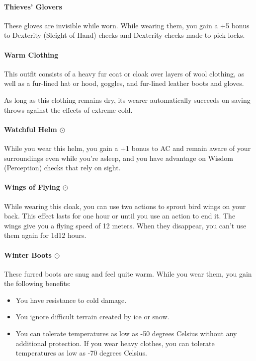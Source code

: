     \paragraph{Thieves' Glovers}
        These gloves are invisible while worn.
        While wearing them, you gain a +5 bonus to Dexterity (Sleight of Hand) checks and Dexterity checks made to pick locks.
    \paragraph{Warm Clothing}
        This outfit consists of a heavy fur coat or cloak over layers of wool clothing, as well as a fur-lined hat or hood, goggles, and fur-lined leather boots and gloves.

        As long as this clothing remains dry, its wearer automatically succeeds on saving throws against the effects of extreme cold.
    \paragraph{Watchful Helm $\odot$}
        While you wear this helm, you gain a +1 bonus to AC and remain aware of your surroundings even while you're asleep, and you have advantage on Wisdom (Perception) checks that rely on sight.
    \paragraph{Wings of Flying $\odot$}
        While wearing this cloak, you can use two actions to sprout bird wings on your back.
        This effect lasts for one hour or until you use an action to end it.
        The wings give you a flying speed of 12 meters.
        When they disappear, you can't use them again for 1d12 hours.
    \paragraph{Winter Boots $\odot$}
        These furred boots are snug and feel quite warm.
        While you wear them, you gain the following benefits:
        \begin{itemize}
            \item You have resistance to cold damage.
            \item You ignore difficult terrain created by ice or snow.
            \item You can tolerate temperatures as low as -50 degrees Celsius without any additional protection.
            If you wear heavy clothes, you can tolerate temperatures as low as -70 degrees Celsius.
        \end{itemize}
\newpage~\newpage
